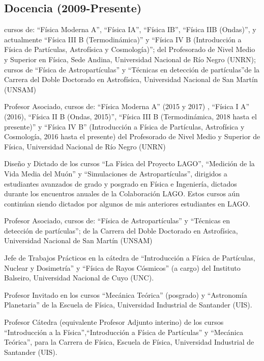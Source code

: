 \subsection*{Docencia (2009-Presente)}
\begin{description}
\ifres
	\item [Profesor Asociado] cursos de: ``Física Moderna A'', ``Física IA'', ``Física IB'', ``Física IIB (Ondas)'', y actualmente ``Física III B (Termodinámica)'' y ``Física IV B (Introducción a Física de Partículas, Astrofísica y Cosmología)''; del Profesorado de Nivel Medio y Superior en Física, Sede Andina, Universidad Nacional de Río Negro (UNRN); cursos de ``Física de Astropartículas'' y ``Técnicas en detección de partículas''de la Carrera del Doble Doctorado en Astrofísica, Universidad Nacional de San Martín (UNSAM)
\else
	\item [2015-presente] Profesor Asociado, cursos de: ``Física Moderna A'' (2015 y 2017) , ``Física I A'' (2016), ``Física II B (Ondas, 2015)'', ``Física III B (Termodinámica, 2018 hasta el presente)'' y ``Física IV B'' (Introducción a Física de Partículas, Astrofísica y Cosmología, 2016 hasta el presente) del Profesorado de Nivel Medio y Superior de Física, Universidad Nacional de Río Negro (UNRN)
	\item [2012-2020] Diseño y Dictado de los cursos ``La Física del Proyecto LAGO'', ``Medición de la Vida Media del Muón'' y ``Simulaciones de Astropartículas'', dirigidos a estudiantes avanzados de grado y posgrado en Física e Ingeniería, dictados durante los encuentros anuales de la Colaboración LAGO. Estos cursos aún continúan siendo dictados por algunos de mis anteriores estudiantes en LAGO.
	\item [2018-2021] Profesor Asociado, cursos de: ``Física de Astropartículas'' y ``Técnicas en detección de partículas''; de la Carrera del Doble Doctorado en Astrofísica, Universidad Nacional de San Martín (UNSAM)
 	\item [2015-2017] Jefe de Trabajos Prácticos en la cátedra de ``Introducción a Física de Partículas, Nuclear y Dosimetría'' y ``Física de Rayos Cósmicos'' (a cargo) del Instituto Balseiro, Universidad Nacional de Cuyo (UNC).
	\item [2014-2015] Profesor Invitado en los cursos ``Mecánica Teórica'' (posgrado) y ``Astronomía Planetaria'' de la Escuela de Física, Universidad Industrial de Santander (UIS).
	\item [2013-2014] Profesor Cátedra (equivalente Profesor Adjunto interino) de los cursos ``Introducción a la Física'',``Introducción a Física de Partículas'' y ``Mecánica Teórica'', para la Carrera de Física, Escuela de Física, Universidad Industrial de Santander (UIS).

\end{description}
